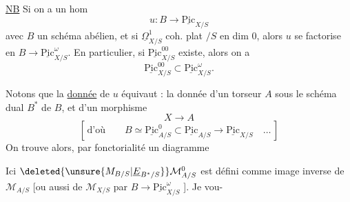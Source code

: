 \uline{NB} Si on a un hom
\[
u:B\longrightarrow\underline{\mathrm{Pic}}_{X/S}
\]
avec $B$ un schéma abélien, et si $\underline{\Omega}^{1}_{X/S}$ coh. plat $/S$ en dim $0$, alors $u$ se factorise en $B\longrightarrow\underline{\mathrm{Pic}}_{X/S}^{\omega}$. En particulier, si $\underline{\mathrm{Pic}}_{X/S}^{00}$ existe, alors on a
\[
\underline{\mathrm{Pic}}_{X/S}^{00}\subset\underline{\mathrm{Pic}}_{X/S}^{\omega}.
\]

Notons que la \uline{donnée} de $u$ équivaut :  la donnée d'un torseur $A$ sous  le schéma dual $B^{*}$ de $B$, et d'un morphisme
\[
X\longrightarrow A
\]
\[
[\,\text{d'où}\qquad B\simeq\underline{\mathrm{Pic}}^{0}_{A/S}\subset\underline{\mathrm{Pic}}_{A/S}\longrightarrow\underline{\mathrm{Pic}}_{X/S}\quad\ldots\,]
\]
On trouve alors, par fonctorialité un diagramme

Ici $\deleted{\unsure{M_{B/S}|\underline E_{B^*/S}}}\mathcal M^{0}_{A/S}$ est défini comme image inverse de $\mathcal M_{A/S}$  [ou aussi de $\mathcal M_{X/S}$ par $B\longrightarrow\underline{\mathrm{Pic}}^{\omega}_{X/S}$ ]. Je vou-


